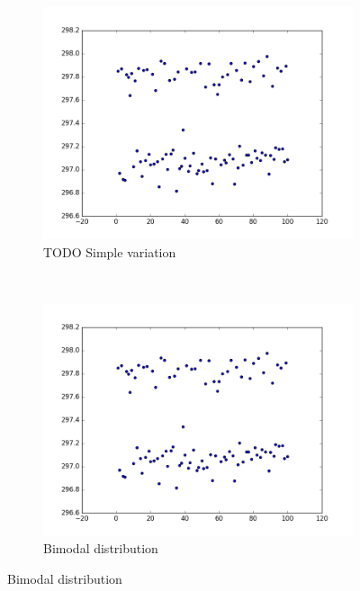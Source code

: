 \documentclass[conference]{IEEEtran}
\begin{document}
\begin{figure}
\centering

\begin{subfigure}{0.22\textwidth}
    \centering
    \includegraphics[width=\textwidth]{experiments/images/mean_repeated_branchsum}
    \caption{TODO Simple variation}
\end{subfigure}%
~
\begin{subfigure}{0.22\textwidth}
    \centering
    \includegraphics[width=\textwidth]{experiments/images/mean_repeated_branchsum}
    \caption{Bimodal distribution}
\end{subfigure}


\end{figure}
\end{document}
